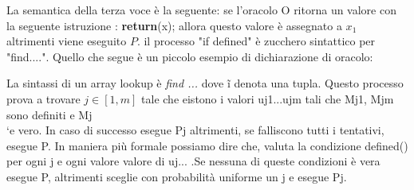 \documentclass[a4paper,openright,twoside,12pt]{report}
\newcommand{\return}[1]{\textbf{return}(#1);}
\begin{document}
La semantica della terza voce \`e la seguente: se l'oracolo O ritorna un valore con la seguente istruzione : \return{x} allora questo valore \`e assegnato a $x_1$ altrimenti viene
eseguito $P$.
il processo "if defined" \`e zucchero sintattico per "find....".
Quello che segue \`e un piccolo esempio di dichiarazione di oracolo:




La sintassi di un array lookup \`e \emph{find ...} dove \~i denota una tupla.  Questo processo prova a trovare $j \in [1, m]$ tale che eistono i valori uj1...ujm tali che
Mj1, Mjm sono definiti e Mj \\`e vero. In caso di successo esegue Pj altrimenti, se falliscono tutti i tentativi, esegue P.
In maniera pi\`u formale possiamo dire che, valuta la condizione defined() per ogni j e ogni valore valore di uj... .Se nessuna di queste condizioni \`e vera esegue P, altrimenti
sceglie con probabilit\`a uniforme un j e esegue Pj.
\end{document}
